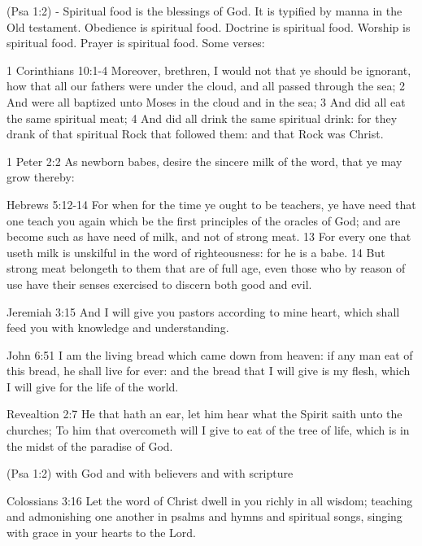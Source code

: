 \begin{compactenum}[I.]
\begin{compactenum}[A.]
    \end{compactenum}
	\item {} (Psa 1:2) - Spiritual food is the blessings of God. It is typified by manna in the Old testament. Obedience is spiritual food. Doctrine is spiritual food. Worship is spiritual food. Prayer is spiritual food. Some verses:
    \begin{compactenum}[A.]
		\item 1 Corinthians 10:1-4 Moreover, brethren, I would not that ye should be ignorant, how that all our fathers were under the cloud, and all passed through the sea; 2 And were all baptized unto Moses in the cloud and in the sea; 3 And did all eat the same spiritual meat; 4 And did all drink the same spiritual drink: for they drank of that spiritual Rock that followed them: and that Rock was Christ.
		\item 1 Peter 2:2 As newborn babes, desire the sincere milk of the word, that ye may grow thereby:
		\item Hebrews 5:12-14 For when for the time ye ought to be teachers, ye have need that one teach you again which be the first principles of the oracles of God; and are become such as have need of milk, and not of strong meat. 13 For every one that useth milk is unskilful in the word of righteousness: for he is a babe. 14 But strong meat belongeth to them that are of full age, even those who by reason of use have their senses exercised to discern both good and evil.
		\item Jeremiah 3:15 And I will give you pastors according to mine heart, which shall feed you with knowledge and understanding.
		\item John 6:51 I am the living bread which came down from heaven: if any man eat of this bread, he shall live for ever: and the bread that I will give is my flesh, which I will give for the life of the world.
		\item Revealtion 2:7 He that hath an ear, let him hear what the Spirit saith unto the churches; To him that overcometh will I give to eat of the tree of life, which is in the midst of the paradise of God.
    \end{compactenum}
    \item {} (Psa 1:2) with God and with believers and with scripture
    \begin{compactenum}[A.]
    	\item Colossians 3:16 Let the word of Christ dwell in you richly in all wisdom; teaching and admonishing one another in psalms and hymns and spiritual songs, singing with grace in your hearts to the Lord.

\end{compactenum}
\end{compactenum}

